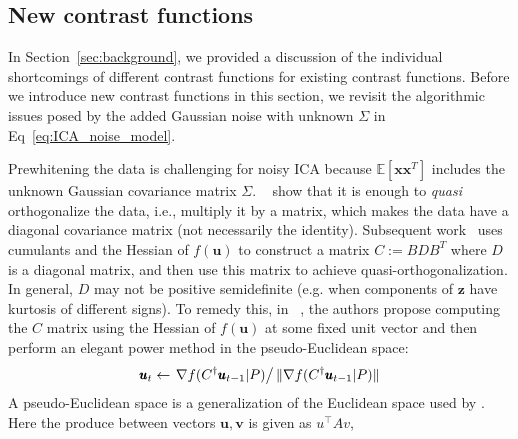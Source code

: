 \documentclass[letterpaper]{article}
\newcommand{\ba}[1]{\begin{align}#1\end{align}}
\newcommand{\bu}{\pmb{u}}
\newcommand{\bx}{\pmb{x}}
\newcommand{\bz}{\pmb{z}}
\newcommand{\bv}{\pmb{v}}
\newcommand{\rd}{\color{red}}
\newcommand{\bk}{\color{black}}
\newcommand{\E}{\mathbb{E}}
\begin{document}
\subsection{New contrast functions}\label{section:chf_cgf_fn}
In Section~\ref{sec:background}, we provided a discussion of the individual shortcomings of different contrast functions for existing contrast functions.  Before we introduce new contrast functions in this section, we revisit the algorithmic issues posed by the added Gaussian noise with unknown $\Sigma$ in Eq~\ref{eq:ICA_noise_model}.

Prewhitening the data is challenging for noisy ICA because $\E[\bx\bx^T]$ includes the unknown Gaussian covariance matrix $\Sigma$. ~\cite{arora2012Quasi} show that it is enough to \textit{quasi} orthogonalize the data, i.e., multiply it by a matrix, which makes the data have a diagonal covariance matrix (not necessarily the identity). Subsequent work~\cite{NIPS2013_4d2e7bd3, NIPS2015_89f03f7d} uses cumulants and the Hessian of $f(\bu)$ to construct a matrix $C := BDB^T$ where $D$ is a diagonal matrix, and then use this matrix to achieve quasi-orthogonalization. In general, $D$ may not be positive semidefinite (e.g. when components of $\bz$ have kurtosis of different signs). %
To remedy this, in ~\cite{ NIPS2015_89f03f7d}, the authors propose computing the $C$ matrix using the Hessian of $f(\bu)$ at some fixed unit vector and then perform an elegant power method in the pseudo-Euclidean space:
\ba{
\bu_{t} \leftarrow \left.\nabla f(C^{\dag}\bu_{t-1}|P)\right/\|\nabla f(C^{\dag}\bu_{t-1}|P)\| \label{eq:power}
}
A pseudo-Euclidean space is a generalization of the Euclidean space used by \cite{DBLP:journals/corr/VossBR15}. Here the produce between vectors $\bu,\bv$ is given as $u^{\top}Av$,
\end{document}
